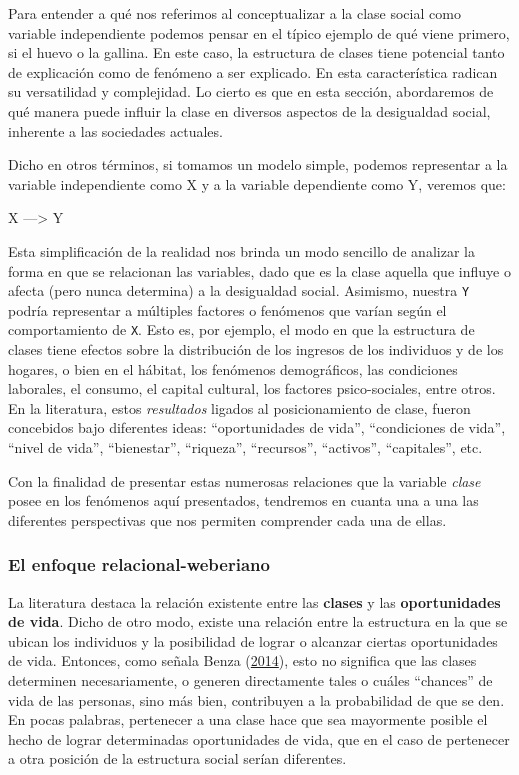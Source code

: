\documentclass[
]{article}
\begin{document}
Para entender a qué nos referimos al conceptualizar a la clase social como variable independiente podemos pensar en el típico ejemplo de qué viene primero, si el huevo o la gallina. En este caso, la estructura de clases tiene potencial tanto de explicación como de fenómeno a ser explicado. En esta característica radican su versatilidad y complejidad. Lo cierto es que en esta sección, abordaremos de qué manera puede influir la clase en diversos aspectos de la desigualdad social, inherente a las sociedades actuales.

Dicho en otros términos, si tomamos un modelo simple, podemos representar a la variable independiente como X y a la variable dependiente como Y, veremos que:

X ---\textgreater{} Y

Esta simplificación de la realidad nos brinda un modo sencillo de analizar la forma en que se relacionan las variables, dado que es la clase aquella que influye o afecta (pero nunca determina) a la desigualdad social. Asimismo, nuestra \texttt{Y} podría representar a múltiples factores o fenómenos que varían según el comportamiento de \texttt{X}. Esto es, por ejemplo, el modo en que la estructura de clases tiene efectos sobre la distribución de los ingresos de los individuos y de los hogares, o bien en el hábitat, los fenómenos demográficos, las condiciones laborales, el consumo, el capital cultural, los factores psico-sociales, entre otros. En la literatura, estos \emph{resultados} ligados al posicionamiento de clase, fueron concebidos bajo diferentes ideas: ``oportunidades de vida'', ``condiciones de vida'', ``nivel de vida'', ``bienestar'', ``riqueza'', ``recursos'', ``activos'', ``capitales'', etc.

Con la finalidad de presentar estas numerosas relaciones que la variable \emph{clase} posee en los fenómenos aquí presentados, tendremos en cuanta una a una las diferentes perspectivas que nos permiten comprender cada una de ellas.

\hypertarget{el-enfoque-relacional-weberiano}{%
\subsubsection{El enfoque relacional-weberiano}\label{el-enfoque-relacional-weberiano}}

La literatura destaca la relación existente entre las \textbf{clases} y las \textbf{oportunidades de vida}. Dicho de otro modo, existe una relación entre la estructura en la que se ubican los individuos y la posibilidad de lograr o alcanzar ciertas oportunidades de vida. Entonces, como señala Benza (\protect\hyperlink{ref-Benza2014}{2014}), esto no significa que las clases determinen necesariamente, o generen directamente tales o cuáles ``chances'' de vida de las personas, sino más bien, contribuyen a la probabilidad de que se den. En pocas palabras, pertenecer a una clase hace que sea mayormente posible el hecho de lograr determinadas oportunidades de vida, que en el caso de pertenecer a otra posición de la estructura social serían diferentes.
\end{document}
